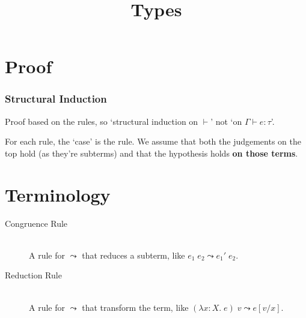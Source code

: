 \documentclass[11pt]{article}
\title{\vspace{-1cm}Types\vspace{-1cm}}
\author{}
\date{}
\begin{document}
\maketitle
\section{Proof}
{
    \subsubsection*{Structural Induction}
    {

        Proof based on the rules, so `structural induction on \(\vdash\)' not `on \(\Gamma\vdash e : \tau\)'.

        For each rule, the `case' is the rule. We assume that both the judgements on the top hold (as they're subterms)
        and that the hypothesis holds \textbf{on those terms}.
    
    }
}
\section{Terminology}
{
    \begin{description}
    \item[Congruence Rule]\hfill\\A rule for \(\leadsto\) that reduces a subterm, like \(e_1\;e_2 \leadsto e_1'\;e_2\).
    \item[Reduction Rule]\hfill\\A rule for \(\leadsto\) that transform the term, like \((\lambda x:X.\;e)\;v \leadsto
    e[v/x]\).
    \end{description}
}
\end{document}
